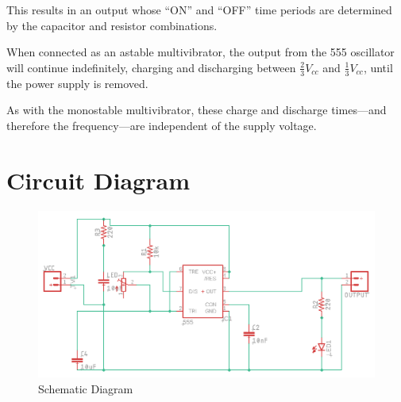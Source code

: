 \documentclass[a4paper,12pt]{article}
\begin{document}
This results in an output whose ``ON'' and ``OFF'' time periods are determined by the capacitor and resistor combinations.

When connected as an astable multivibrator, the output from the 555 oscillator will continue indefinitely, charging and discharging between $\frac{2}{3}V_{cc}$ and $\frac{1}{3}V_{cc}$, until the power supply is removed.

As with the monostable multivibrator, these charge and discharge times—and therefore the frequency—are independent of the supply voltage.

\section{Circuit Diagram}
	\begin{figure}[H]
	\centering
	\includegraphics[width=1\linewidth]{"Images/1"}
	\caption{Schematic Diagram}
\end{figure}
\end{document}
